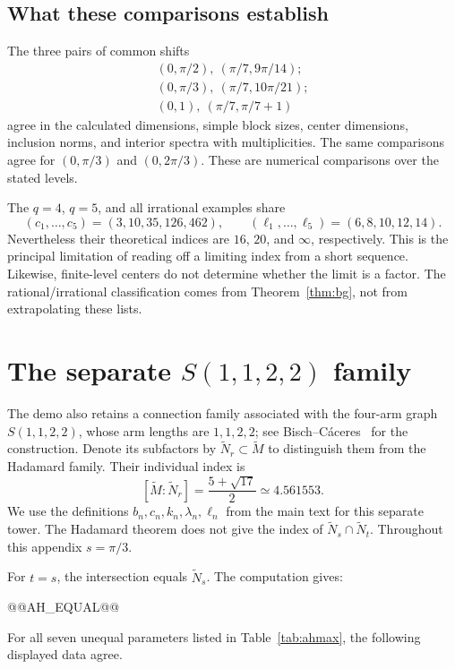 \documentclass[11pt]{article}
\theoremstyle{definition}
\theoremstyle{remark}
\begin{document}
\subsection{What these comparisons establish}
The three pairs of common shifts
\[
 \begin{gathered}
 (0,\pi/2),\ (\pi/7,9\pi/14);\\
 (0,\pi/3),\ (\pi/7,10\pi/21);\\
 (0,1),\ (\pi/7,\pi/7+1)
 \end{gathered}
\]
agree in the calculated dimensions, simple block sizes, center
dimensions, inclusion norms, and interior spectra with multiplicities.
The same comparisons agree for \((0,\pi/3)\) and \((0,2\pi/3)\).
These are numerical comparisons over the stated levels.

The \(q=4\), \(q=5\), and all irrational examples share
\[
 (c_1,\ldots,c_5)=(3,10,35,126,462),\qquad
 (\ell_1,\ldots,\ell_5)=(6,8,10,12,14).
\]
Nevertheless their theoretical indices are \(16\), \(20\), and
\(\infty\), respectively. This is the principal limitation of
reading off a limiting index from a short sequence.
Likewise, finite-level centers do not determine whether the limit
is a factor. The rational/irrational classification comes from
Theorem~\ref{thm:bg}, not from extrapolating these lists.

\appendix
\section[The separate S(1,1,2,2) family]{The separate \(S(1,1,2,2)\) family}\label{sec:ah}
The demo also retains a connection family associated with the four-arm
graph \(S(1,1,2,2)\), whose arm lengths are \(1,1,2,2\); see
Bisch--C\'aceres~\cite{BC} for the construction.
Denote its subfactors by \(\widetilde N_r\subset\widetilde M\)
to distinguish them from the Hadamard family. Their individual index is
\[
 [\widetilde M:\widetilde N_r]=\frac{5+\sqrt{17}}2
 \simeq4.561553.
\]
We use the definitions \(b_n,c_n,k_n,\lambda_n,\ell_n\) from the
main text for this separate tower. The Hadamard theorem does not
give the index of \(\widetilde N_s\cap\widetilde N_t\).
Throughout this appendix \(s=\pi/3\).

For \(t=s\), the intersection equals \(\widetilde N_s\).
The computation gives:

@@AH_EQUAL@@

For all seven unequal parameters listed in Table~\ref{tab:ahmax},
the following displayed data agree.
\end{document}
